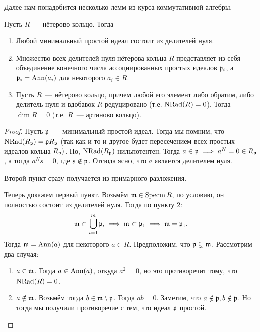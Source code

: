  	Далее нам понадобится несколько лемм из курса коммутативной алгебры. 

 	\begin{lemma}\label{4_lemma_1} 
 		Пусть $R$~--- нётерово кольцо. Тогда 
 		\begin{enumerate}
 			\item Любой минимальный простой идеал состоит из делителей нуля. 
 			\item Множество всех делителей нуля нётерова кольца $R$ представляет из себя объединение конечного числа ассоциированных простых идеалов $\mathfrak{p}_{i}$, а $\mathfrak{p}_i = \operatorname{Ann}(a_i)$ для некоторого $a_i \in R$.
 			\item Пусть $R$~--- нётерово кольцо, причем любой его элемент либо обратим, либо делитель нуля и вдобавок $R$ редуцировано (т.е. $\operatorname{NRad}(R) = 0$). Тогда $\dim{R} = 0$ (т.е. $R$~--- артиново кольцо). 
 		\end{enumerate}
 	\end{lemma}
 	\begin{proof}
 		Пусть $\mathfrak{p}$~--- минимальный простой идеал. Тогда мы помним, что $\operatorname{NRad}(R_{\mathfrak{p}}) = \mathfrak{p} R_{\mathfrak{p}}$ (так как и то и другое будет пересечением всех простых идеалов кольца $R_{\mathfrak{p}})$. Но, $\operatorname{NRad}(R_{\mathfrak{p}})$  нильпотентен. Тогда $a \in \mathfrak{p} \implies a^{N} = 0 \in R_{\mathfrak{p}}$, а тогда $a^{N}s = 0$, где $s \notin \mathfrak{p}$. Отсюда ясно, что $a$ является делителем нуля.  

 		Второй пункт сразу получается из примарного разложения. 

 		Теперь докажем первый пункт. Возьмём $\mathfrak{m} \in \operatorname{Specm}{R}$, по условию, он полностью состоит из делителей нуля. Тогда по пункту $2$:
 		\[
 			\mathfrak{m} \subset \bigcup_{i = 1}^{m} \mathfrak{p}_i \implies \mathfrak{m} \subset \mathfrak{p}_1 \implies \mathfrak{m} = \mathfrak{p}_1.
 		\]
 		Тогда $\mathfrak{m} = \operatorname{Ann}(a)$ для некоторого $a \in R$. Предположим, что $\mathfrak{p} \subsetneq \mathfrak{m}$. Рассмотрим два случая: 
 		\begin{enumerate}
 			\item $a \in \mathfrak{m}$. Тогда $a \in \operatorname{Ann}(a)$, откуда $a^2 = 0$, но это противоречит тому, что $\operatorname{NRad}(R) = 0$. 

 			\item $a \notin \mathfrak{m}$. Возьмём тогда $b \in \mathfrak{m} \setminus \mathfrak{p}$. Тогда $a b = 0$. Заметим, что $a \notin \mathfrak{p}, b \notin \mathfrak{p}$. Но тогда мы получили противоречие с тем, что идеал $\mathfrak{p}$ простой. 
 		\end{enumerate}
 	\end{proof}


